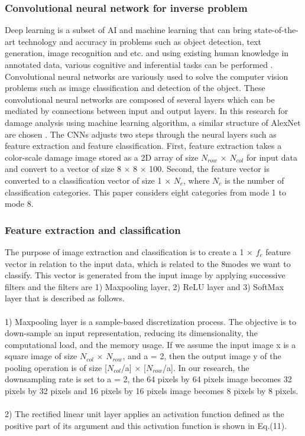 \subsubsection{Convolutional neural network for inverse problem}
\label{subsubsec3}
Deep learning is a subset of AI and machine learning that can bring state-of-the-art technology and accuracy in problems such as object detection, text generation, image recognition and etc. and using existing human knowledge in annotated data, various cognitive and inferential tasks can be performed \cite{Ref20,Ref21,Ref22}. Convolutional neural networks are variously used to solve the computer vision problems such as image classification and detection of the object. These convolutional neural networks are composed of several layers which can be mediated by connections between input and output layers. In this research for damage analysis using machine learning algorithm, a similar structure of AlexNet are chosen \cite{Ref23}. The CNNs adjusts two steps through the neural layers such as feature extraction and feature classification. First, feature extraction takes a color-scale damage image stored as a 2D array of size $N_{row}$ $\times$ $N_{col}$ for input data and convert to a vector of size 8 $\times$ 8 $\times$ 100. Second, the feature vector is converted to a classification vector of size 1 $\times$ $N_{c}$, where $N_{c}$ is the number of classification categories. This paper considers eight categories from mode 1 to mode 8.

\subsubsection{Feature extraction and classification}
\label{subsubsec3}
The purpose of image extraction and classification is to create a 1 $\times$ $f_c$ feature vector in relation to the input data, which is related to the 8modes we want to classify. This vector is generated from the input image by applying successive filters and the filters are 1) Maxpooling layer, 2) ReLU layer and 3) SoftMax layer that is  described as follows.
\\
\\
1) Maxpooling layer \cite{Ref24} is a sample-based discretization process. The objective is to down-sample an input representation, reducing its dimensionality, the computational load, and the memory usage. If we assume the input image x is a square image of size $N_{col}$ $\times$ $N_{row}$, and a = 2, then the output image y of the pooling operation is of size [$N_{col}$/a] $\times$ [$N_{row}$/a]. In our research, the downsampling rate is set to a = 2,
the 64 pixels by 64 pixels image becomes 32 pixels by 32 pixels and 16 pixels by 16 pixels image becomes 8 pixels by 8 pixels.
\\
\\
2) The rectified linear unit layer \cite{Ref25} applies an activation function defined as the positive part of its argument and this activation function is shown in Eq.(11).

